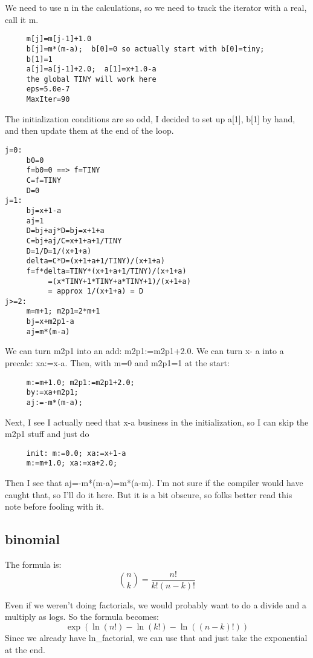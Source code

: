 We need to use n in the calculations, so we need to track the
iterator with a real, call it m.
\begin{verbatim}
     m[j]=m[j-1]+1.0
     b[j]=m*(m-a);  b[0]=0 so actually start with b[0]=tiny;
     b[1]=1
     a[j]=a[j-1]+2.0;  a[1]=x+1.0-a
     the global TINY will work here
     eps=5.0e-7
     MaxIter=90
\end{verbatim}
     
The initialization conditions are so odd, I decided to set
up a[1], b[1] by hand, and then update them at the end of
the loop.
\begin{verbatim}
j=0:
     b0=0
     f=b0=0 ==> f=TINY
     C=f=TINY
     D=0
j=1:
     bj=x+1-a
     aj=1
     D=bj+aj*D=bj=x+1+a
     C=bj+aj/C=x+1+a+1/TINY
     D=1/D=1/(x+1+a)
     delta=C*D=(x+1+a+1/TINY)/(x+1+a)
     f=f*delta=TINY*(x+1+a+1/TINY)/(x+1+a)
          =(x*TINY+1*TINY+a*TINY+1)/(x+1+a)
          = approx 1/(x+1+a) = D
j>=2:
     m=m+1; m2p1=2*m+1
     bj=x+m2p1-a
     aj=m*(m-a)
\end{verbatim}
We can turn m2p1 into an add: m2p1:=m2p1+2.0.  We can turn x-
a into a precalc: xa:=x-a.  Then, with m=0 and m2p1=1 at the
start:
\begin{verbatim}
     m:=m+1.0; m2p1:=m2p1+2.0;
     by:=xa+m2p1;
     aj:=-m*(m-a);
\end{verbatim}

Next, I see I actually need that x-a business in the
initialization, so I can skip the m2p1 stuff and just do
\begin{verbatim}
     init: m:=0.0; xa:=x+1-a
     m:=m+1.0; xa:=xa+2.0;
\end{verbatim}

Then I see that aj=-m*(m-a)=m*(a-m).  I'm not sure if the
compiler would have caught that, so I'll do it here.  But it
is a bit obscure, so folks better read this note before
fooling with it.


\subsection*{binomial}
The formula is:
\begin{equation}
  {n \choose k} = \frac{n!}{k!(n-k)!}
\end{equation}

Even if we weren't doing factorials, we would
probably want to do a divide and a multiply as logs.  So the
formula becomes:
\begin{equation}
  \exp(\ln(n!)-\ln(k!)-\ln((n-k)!))
\end{equation}
Since we already have ln\_factorial, we can use that and just take
the exponential at the end.

